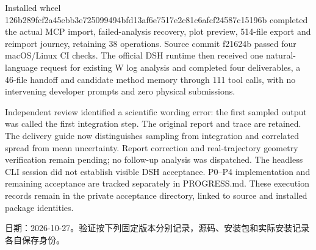 \documentclass[11pt,a4paper]{ctexart}
\begin{document}
Installed wheel 126b289f\allowbreak{}cf2a45eb\allowbreak{}b3e72509\allowbreak{}9494bfd1\allowbreak{}3af6e751\allowbreak{}7e2c81c6\allowbreak{}afcf2458\allowbreak{}7c15196b completed the actual MCP import, failed-analysis recovery, plot preview, 514-file export and reimport journey, retaining 38 operations. Source commit f21624b passed four macOS/\allowbreak{}Linux CI checks. The official DSH runtime then received one natural-language request for existing W log analysis and completed four deliverables, a 46-file handoff and candidate method memory through 111 tool calls, with no intervening developer prompts and zero physical submissions.



Independent review identified a scientific wording error: the first sampled output was called the first integration step. The original report and trace are retained. The delivery guide now distinguishes sampling from integration and correlated spread from mean uncertainty. Report correction and real-trajectory geometry verification remain pending; no follow-up analysis was dispatched. The headless CLI session did not establish visible DSH acceptance. P0–P4 implementation and remaining acceptance are tracked separately in PROGRESS.md. These execution records remain in the private acceptance directory, linked to source and installed package identities.



日期：2026-10-27。验证按下列固定版本分别记录，源码、安装包和实际安装记录各自保存身份。
\end{document}
